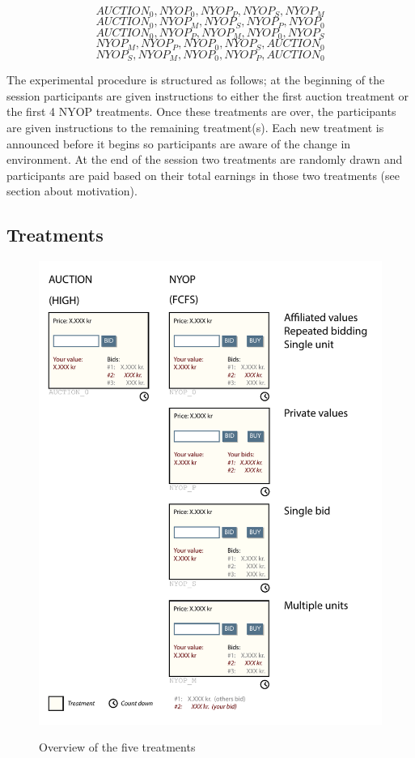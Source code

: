 \documentclass[a4paper,12pt]{article}
\makeatletter
\newcommand\fix{%
  \let\set@color\beamerorig@set@color
  \let\reset@color\beamerorig@reset@color}
\makeatother
\begin{document}
\[	{AUCTION_0, NYOP_0, NYOP_P, NYOP_S, NYOP_M} \]
\[	{AUCTION_0, NYOP_M, NYOP_S, NYOP_P, NYOP_0} \]
\[	{AUCTION_0, NYOP_P, NYOP_M, NYOP_0, NYOP_S} \]
\[	{NYOP_M, NYOP_P, NYOP_0, NYOP_S, AUCTION_0} \]
\[	{NYOP_S, NYOP_M, NYOP_0, NYOP_P, AUCTION_0} \]
	
	The experimental procedure is structured as follows; at the beginning of the session participants are given instructions to either the first auction treatment or the first 4 NYOP treatments. Once these treatments are over, the participants are given instructions to the remaining treatment(s). Each new treatment is announced before it begins so participants are aware of the change in environment. At the end of the session two treatments are randomly drawn and participants are paid based on their total earnings in those two treatments (see section about motivation).


	\subsection{Treatments}

	\begin{figure}
	        \centering
	        \caption{Overview of the five treatments}
	        \includegraphics[width=\textwidth]{Figures/Treatments}
			\label{fig:treatments}
	\end{figure}
\end{document}
